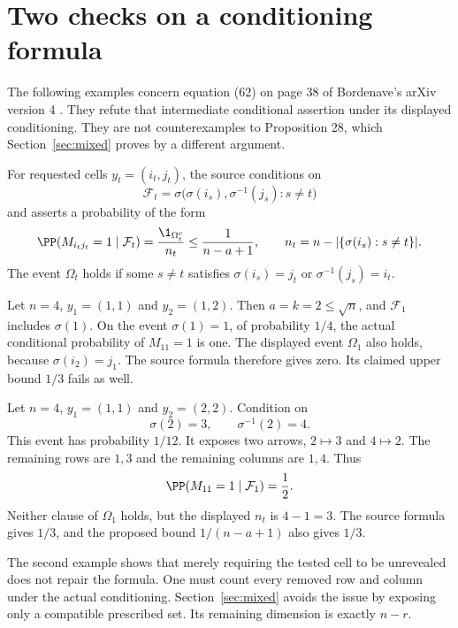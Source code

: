 \section{Two checks on a conditioning formula}\label{sec:conditioning}

The following examples concern equation (62) on page 38 of Bordenave's arXiv version 4 \cite{Bordenave}. They refute that intermediate conditional assertion under its displayed conditioning. They are not counterexamples to Proposition 28, which Section~\ref{sec:mixed} proves by a different argument.

For requested cells $y_t=(i_t,j_t)$, the source conditions on
\[
\mathcal F_t=\sigma\bigl(\sigma(i_s),\sigma^{-1}(j_s):s\ne t\bigr)
\]
and asserts a probability of the form
\[
\PP(M_{i_tj_t}=1\mid\mathcal F_t)
=\frac{\1_{\Omega_t^c}}{n_t}\le\frac1{n-a+1},
\qquad
n_t=n-|\{\sigma(i_s):s\ne t\}|.
\]
The event $\Omega_t$ holds if some $s\ne t$ satisfies $\sigma(i_s)=j_t$ or $\sigma^{-1}(j_s)=i_t$.

\begin{example}
Let $n=4$, $y_1=(1,1)$ and $y_2=(1,2)$. Then $a=k=2\le\sqrt n$, and $\mathcal F_1$ includes $\sigma(1)$. On the event $\sigma(1)=1$, of probability $1/4$, the actual conditional probability of $M_{11}=1$ is one. The displayed event $\Omega_1$ also holds, because $\sigma(i_2)=j_1$. The source formula therefore gives zero. Its claimed upper bound $1/3$ fails as well.
\end{example}

\begin{example}
Let $n=4$, $y_1=(1,1)$ and $y_2=(2,2)$. Condition on
\[
\sigma(2)=3,\qquad \sigma^{-1}(2)=4.
\]
This event has probability $1/12$. It exposes two arrows, $2\mapsto3$ and $4\mapsto2$. The remaining rows are $1,3$ and the remaining columns are $1,4$. Thus
\[
\PP(M_{11}=1\mid\mathcal F_1)=\frac12.
\]
Neither clause of $\Omega_1$ holds, but the displayed $n_t$ is $4-1=3$. The source formula gives $1/3$, and the proposed bound $1/(n-a+1)$ also gives $1/3$.
\end{example}

The second example shows that merely requiring the tested cell to be unrevealed does not repair the formula. One must count every removed row and column under the actual conditioning. Section~\ref{sec:mixed} avoids the issue by exposing only a compatible prescribed set. Its remaining dimension is exactly $n-r$.
